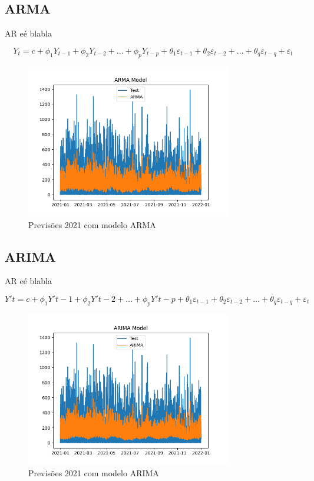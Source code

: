\subsection{ARMA}

AR eé blabla

\begin{equation} \label{eq:ARMA}  Y_t = c + \phi_1 Y_{t-1} + \phi_2 Y_{t-2} + \dots + \phi_p Y_{t-p} + \theta_1 \varepsilon_{t-1} + \theta_2 \varepsilon_{t-2} + \dots + \theta_q \varepsilon_{t-q} + \varepsilon_t  \end{equation}

\begin{figure}[H]
    \centering
    \includegraphics[width=0.8\textwidth]{../plots/ARMA_model.png}
    \caption{Previsões 2021 com modelo ARMA}
    \label{fig:ARMA_model}
\end{figure}

\subsection{ARIMA}

AR eé blabla

\begin{equation} \label{eq:ARIMA} Y't = c + \phi_1 Y'{t-1} + \phi_2 Y'{t-2} + \dots + \phi_p Y'{t-p} + \theta_1 \varepsilon_{t-1} + \theta_2 \varepsilon_{t-2} + \dots + \theta_q \varepsilon_{t-q} + \varepsilon_t \end{equation}

\begin{figure}[H]
    \centering
    \includegraphics[width=0.8\textwidth]{../plots/ARIMA_model.png}
    \caption{Previsões 2021 com modelo ARIMA}
    \label{fig:ARIMA_model}
\end{figure}

